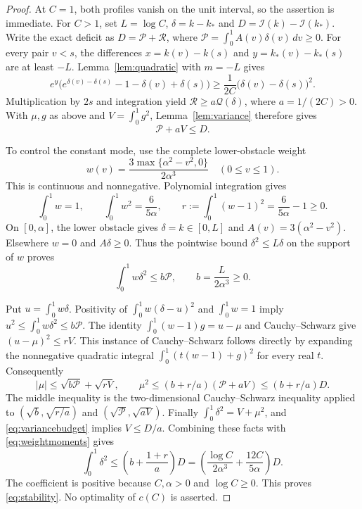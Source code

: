 \documentclass[11pt]{article}
\newcommand{\I}{\mathcal I}
\begin{document}
\begin{proof}
At $C=1$, both profiles vanish on the unit interval, so the assertion is
immediate. For $C>1$, set $L=\log C$, $\delta=k-k_*$ and
$D=\I(k)-\I(k_*)$. Write the exact deficit as
$D=\mathcal P+\mathcal R$, where
$\mathcal P=\int_0^1 A(v)\delta(v)\,dv\geq0$.
For every pair $v<s$, the differences
$x=k(v)-k(s)$ and $y=k_*(v)-k_*(s)$ are at least $-L$.
Lemma~\ref{lem:quadratic} with $m=-L$ gives
\[
 e^y\bigl(e^{\delta(v)-\delta(s)}-1-\delta(v)+\delta(s)\bigr)
 \geq\frac1{2C}\bigl(\delta(v)-\delta(s)\bigr)^2.
\]
Multiplication by $2s$ and integration yield
$\mathcal R\geq a\mathcal Q(\delta)$, where $a=1/(2C)>0$.
With $\mu,g$ as above and $V=\int_0^1g^2$, Lemma~\ref{lem:variance}
therefore gives
\begin{equation}\label{eq:variancebudget}
 \mathcal P+aV\leq D.
\end{equation}

To control the constant mode, use the complete lower-obstacle weight
\[
 w(v)=\frac{3\max\{\alpha^2-v^2,0\}}{2\alpha^3}
       \quad(0\leq v\leq1).
\]
This is continuous and nonnegative. Polynomial integration gives
\begin{equation}\label{eq:weightmoments}
 \int_0^1w=1,\qquad \int_0^1w^2=\frac6{5\alpha},\qquad
 r:=\int_0^1(w-1)^2=\frac6{5\alpha}-1\geq0.
\end{equation}
On $[0,\alpha]$, the lower obstacle gives $\delta=k\in[0,L]$ and
$A(v)=3(\alpha^2-v^2)$. Elsewhere $w=0$ and $A\delta\geq0$.
Thus the pointwise bound $\delta^2\leq L\delta$ on the support of
$w$ proves
\begin{equation}\label{eq:anchor}
 \int_0^1w\delta^2\leq b\mathcal P,
 \qquad b=\frac{L}{2\alpha^3}\geq0.
\end{equation}

Put $u=\int_0^1w\delta$. Positivity of
$\int_0^1w(\delta-u)^2$ and $\int_0^1w=1$ imply
$u^2\leq\int_0^1w\delta^2\leq b\mathcal P$.
The identity $\int_0^1(w-1)g=u-\mu$ and Cauchy--Schwarz give
$(u-\mu)^2\leq rV$. This instance of Cauchy--Schwarz follows directly
by expanding the nonnegative quadratic integral
$\int_0^1(t(w-1)+g)^2$ for every real $t$.
Consequently
\[
 |\mu|\leq\sqrt{b\mathcal P}+\sqrt{rV},\qquad
 \mu^2\leq (b+r/a)(\mathcal P+aV)\leq(b+r/a)D.
\]
The middle inequality is the two-dimensional Cauchy--Schwarz inequality
applied to $(\sqrt b,\sqrt{r/a})$ and
$(\sqrt{\mathcal P},\sqrt{aV})$.
Finally $\int_0^1\delta^2=V+\mu^2$, and \eqref{eq:variancebudget}
implies $V\leq D/a$. Combining these facts with \eqref{eq:weightmoments}
gives
\[
 \int_0^1\delta^2\leq\left(b+\frac{1+r}{a}\right)D
 =\left(\frac{\log C}{2\alpha^3}+\frac{12C}{5\alpha}\right)D.
\]
The coefficient is positive because $C,\alpha>0$ and $\log C\geq0$.
This proves \eqref{eq:stability}. No optimality of $c(C)$ is asserted.
\end{proof}
\end{document}
